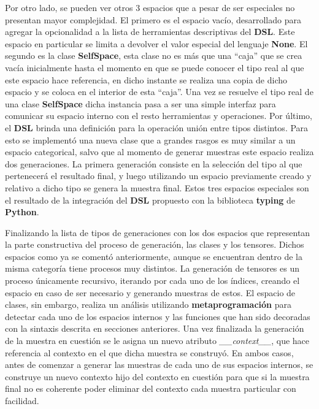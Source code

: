 Por otro lado, se pueden ver otros 3 espacios que a pesar de ser especiales no presentan mayor complejidad. El primero es el
espacio vacío, desarrollado para agregar la opcionalidad a la lista de herramientas descriptivas del {\bf DSL}. Este espacio en
particular se limita a devolver el valor especial del lenguaje {\bf None}. El segundo es la clase {\bf SelfSpace}, esta clase no es
más que una ``caja'' que se crea vacía inicialmente hasta el momento en que se puede conocer el tipo real al que este espacio hace
referencia, en dicho instante se realiza una copia de dicho espacio y se coloca en el interior de esta ``caja''. 
Una vez se resuelve el tipo real de una clase {\bf SelfSpace} dicha instancia pasa a ser una simple interfaz para 
comunicar su espacio interno con el resto herramientas y operaciones.
Por último, el {\bf DSL} brinda una definición para la operación unión entre tipos distintos.
Para esto se implementó una nueva clase que a grandes rasgos es muy similar a un espacio categorical, 
salvo que al momento de generar muestras este espacio realiza dos generaciones. 
La primera generación consiste en la
selección del tipo al que pertenecerá el resultado final, y luego utilizando un espacio previamente creado y relativo a dicho tipo
se genera la muestra final. Estos tres espacios especiales son el resultado de la integración del {\bf DSL} propuesto con la biblioteca
    {\bf typing} de {\bf Python}.

Finalizando la lista de tipos de generaciones con los dos espacios que representan la parte constructiva del proceso de generación,
las clases y los tensores. Dichos espacios como ya se comentó anteriormente, aunque se encuentran dentro de la misma categoría tiene
procesos muy distintos. La generación de tensores es un proceso únicamente recursivo, iterando por cada uno de los índices, creando
el espacio en caso de ser necesario y generando muestras de estos. El espacio de clases, sin embargo, realiza un análisis utilizando
    {\bf metaprogramación} para detectar cada uno de los espacios internos y las funciones que han sido decoradas con la sintaxis descrita en
secciones anteriores. Una vez finalizada la generación de la muestra en cuestión se le asigna un nuevo atributo {\it \_\_context\_\_},
que hace referencia al contexto en el que dicha muestra se construyó. En ambos casos, antes de comenzar a generar las muestras de
cada uno de sus espacios internos, se construye un nuevo contexto hijo del contexto en cuestión para que si la muestra
final no es coherente poder eliminar del contexto cada muestra particular con facilidad.

